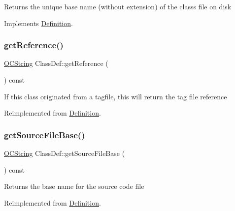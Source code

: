 Returns the unique base name (without extension) of the class\textquotesingle{}s file on disk 

Implements \mbox{\hyperlink{class_definition_acabecdc6bfda2015811eed5f3436322d}{Definition}}.

\mbox{\label{class_class_def_aa19a0146566892e3f947698762d6e3e8}} 
\subsubsection{\texorpdfstring{getReference()}{getReference()}}
{\footnotesize\ttfamily \mbox{\hyperlink{class_q_c_string}{Q\+C\+String}} Class\+Def\+::get\+Reference (\begin{DoxyParamCaption}{ }\end{DoxyParamCaption}) const\hspace{0.3cm}{\ttfamily [virtual]}}

If this class originated from a tagfile, this will return the tag file reference 

Reimplemented from \mbox{\hyperlink{class_definition_a0186c1c36a52590d2c7c9157aaea613f}{Definition}}.

\mbox{\label{class_class_def_a35e351146e4ce259ee129551a167f0bd}} 
\subsubsection{\texorpdfstring{getSourceFileBase()}{getSourceFileBase()}}
{\footnotesize\ttfamily \mbox{\hyperlink{class_q_c_string}{Q\+C\+String}} Class\+Def\+::get\+Source\+File\+Base (\begin{DoxyParamCaption}{ }\end{DoxyParamCaption}) const\hspace{0.3cm}{\ttfamily [virtual]}}

Returns the base name for the source code file 

Reimplemented from \mbox{\hyperlink{class_definition_abdb114d4da6048e834ccae02393790df}{Definition}}.

\mbox{\label{class_class_def_a9da726ec3c85179bc82594908a34afc4}} 
